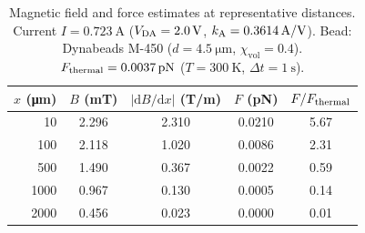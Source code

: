 \begin{table}[htbp]
\centering
\caption{Magnetic field and force estimates at representative distances.
Current $I = \SI{0.723}{\ampere}$ ($V_\mathrm{DA} = \SI{2.0}{\volt}$, $k_\mathrm{A} = \SI{0.3614}{\ampere/\volt}$).
Bead: Dynabeads M-450 ($d = \SI{4.5}{\um}$, $\chi_\mathrm{vol} = 0.4$).
$\Fthermal = \SI{0.0037}{\pico\newton}$ ($T = \SI{300}{\kelvin}$, $\Delta t = \SI{1}{\second}$).}
\label{tab:force-estimates}
\begin{tabular}{@{}rcccc@{}}
\toprule
$x$ (\si{\um}) & $B$ (mT) & $|\mathrm{d}B/\mathrm{d}x|$ (T/m) & $F$ (pN) & $F/F_\mathrm{thermal}$ \\
\midrule
10    & 2.296 & 2.310 & 0.0210 & 5.67 \\
100   & 2.118 & 1.020 & 0.0086 & 2.31 \\
500   & 1.490 & 0.367 & 0.0022 & 0.59 \\
1000  & 0.967 & 0.130 & 0.0005 & 0.14 \\
2000  & 0.456 & 0.023 & 0.0000 & 0.01 \\
\bottomrule
\end{tabular}
\end{table}
